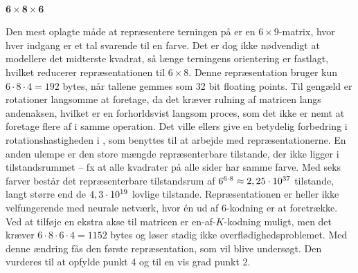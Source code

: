 \documentclass[../main.tex]{subfiles}
\begin{document}
\paragraph{$\mathbf{6\times 8\times 6}$}
Den mest oplagte måde at repræsentere terningen på er en $ 6\times 9 $-matrix, hvor hver indgang er et tal svarende til en farve.
Det er dog ikke nødvendigt at modellere det midterste kvadrat, så længe terningens orientering er fastlagt, hvilket reducerer repræsentationen til $ 6\times 8 $.
Denne repræsentation bruger kun $ 6\cdot 8\cdot 4=192 $ bytes, når tallene gemmes som 32 bit floating points.
Til gengæld er rotationer langsomme at foretage, da det kræver rulning af matricen langs andenaksen, hvilket er en forhorldsvist langsom proces, som det ikke er nemt at foretage flere af i samme operation.
Det ville ellers give en betydelig forbedring i rotationshastigheden i , som benyttes til at arbejde med repræsentationerne.
En anden ulempe er den store mængde repræsenterbare tilstande, der ikke ligger i tilstandsrummet -- fx at alle kvadrater på alle sider har samme farve.
Med seks farver består det repræsenterbare tilstandsrum af $ 6^{6\cdot 8}\approx 2,25\cdot10^{37} $ tilstande, langt større end de $ 4,3\cdot10^{19} $ lovlige tilstande.
Repræsentationen er heller ikke velfungerende med neurale netværk, hvor én ud af \(6\)-kodning er at foretrække.
Ved at tilføje en ekstra akse til matricen er en-af-\(K\)-kodning muligt, men det kræver $ 6\cdot 8\cdot 6\cdot 4=1152 $ bytes og løser stadig ikke overflødighedsproblemet.
Med denne ændring fås den første repræsentation, som vil blive undersøgt.
Den vurderes til at opfylde punkt 4 og til en vis grad punkt 2.
\end{document}
